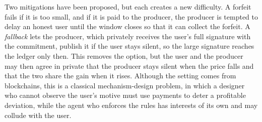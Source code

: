 \documentclass[11pt]{article}
\begin{document}
Two mitigations have been proposed, but each creates a new difficulty. A forfeit fails if it is too small, and if it is paid to the producer, the producer is tempted to delay an honest user until the window closes so that it can collect the forfeit. A \emph{fallback} lets the producer, which privately receives the user's full signature with the commitment, publish it if the user stays silent, so the large signature reaches the ledger only then. This removes the option, but the user and the producer may then agree in private that the producer stays silent when the price falls and that the two share the gain when it rises. Although the setting comes from blockchains, this is a classical mechanism-design problem, in which a designer who cannot observe the user's motive must use payments to deter a profitable deviation, while the agent who enforces the rules has interests of its own and may collude with the user.
\end{document}
